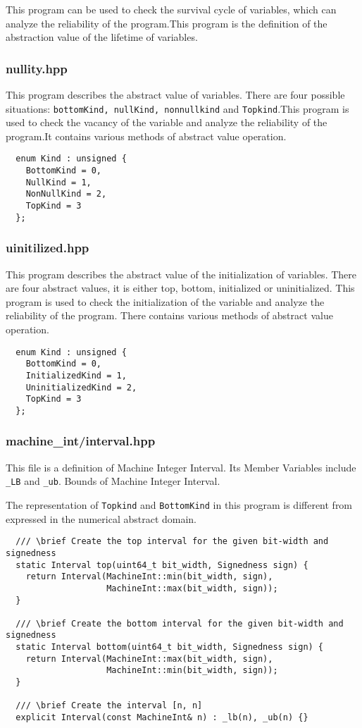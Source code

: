 \documentclass[12pt]{article}
\begin{document}
This program can be used to check the survival cycle of variables, which can analyze the reliability of the program.This program is the definition of the abstraction value of the lifetime of variables.

\subsubsection{nullity.hpp}
This program describes the abstract value of variables. There are four possible situations: \texttt {bottomKind, nullKind, nonnullkind} and \texttt {Topkind}.This program is used to check the vacancy of the variable and analyze the reliability of the program.It contains various methods of abstract value operation.
\begin{lstlisting}
  enum Kind : unsigned {
    BottomKind = 0,
    NullKind = 1,
    NonNullKind = 2,
    TopKind = 3
  };
\end{lstlisting}

\subsubsection{uinitilized.hpp}
This program describes the abstract value of the initialization of variables. There are four abstract values, it is either top, bottom, initialized or uninitialized. This program is used to check the initialization of the variable and analyze the reliability of the program. There contains various methods of abstract value operation.
\begin{lstlisting}
  enum Kind : unsigned {
    BottomKind = 0,
    InitializedKind = 1,
    UninitializedKind = 2,
    TopKind = 3
  };
\end{lstlisting}

\subsubsection{machine\_int/interval.hpp}
This file is a definition of Machine Integer Interval. Its Member Variables include \texttt{\_LB} and \texttt{\_ub}. Bounds of Machine Integer Interval.

The representation of \texttt{Topkind} and \texttt{BottomKind} in this program is different from expressed in the numerical abstract domain.

\begin{lstlisting}
  /// \brief Create the top interval for the given bit-width and signedness
  static Interval top(uint64_t bit_width, Signedness sign) {
    return Interval(MachineInt::min(bit_width, sign),
                    MachineInt::max(bit_width, sign));
  }

  /// \brief Create the bottom interval for the given bit-width and signedness
  static Interval bottom(uint64_t bit_width, Signedness sign) {
    return Interval(MachineInt::max(bit_width, sign),
                    MachineInt::min(bit_width, sign));
  }

  /// \brief Create the interval [n, n]
  explicit Interval(const MachineInt& n) : _lb(n), _ub(n) {}
\end{lstlisting}
\end{document}
